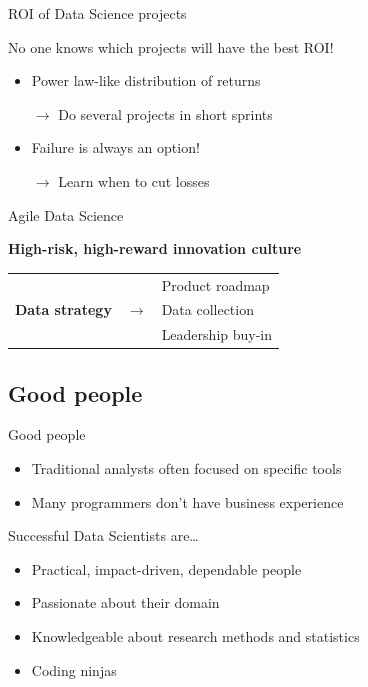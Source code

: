 \begin{frame}{ROI of Data Science projects}
    \begin{center}
        \large%
        No one knows which projects will have the best ROI!
    \end{center}
    \vfill
    \begin{itemize}
        \item Power law\hyp{}like distribution of returns
        \item[$\rightarrow$] Do several projects in short sprints
    \end{itemize}
    \begin{itemize}
        \item Failure is always an option!
        \item[$\rightarrow$] Learn when to cut losses
    \end{itemize}
\end{frame}

\begin{frame}{Agile Data Science}
    \begin{center}
        \Large%
        {\bf%
         High\hyp{}risk, high\hyp{}reward innovation culture}
        \vfill
        \begin{tabular}{rcl}
        \multirow{3}{*}{\textbf{Data strategy}} &       & Product roadmap \\
                                                & $\to$ & Data collection \\
                                                &       & Leadership buy\hyp{}in \\
        \end{tabular}
    \end{center}
\end{frame}

\subsection{Good people}

\begin{frame}{Good people}
    \begin{itemize}
        \item Traditional analysts often focused on specific tools
        \item Many programmers don't have business experience
    \end{itemize}
    \vfill\pause
    Successful Data Scientists are\ldots
    \begin{itemize}
        \item Practical, impact\hyp{}driven, dependable people
        \item Passionate about their domain
        \item Knowledgeable about research methods and statistics
        \item Coding ninjas
    \end{itemize}
\end{frame}

